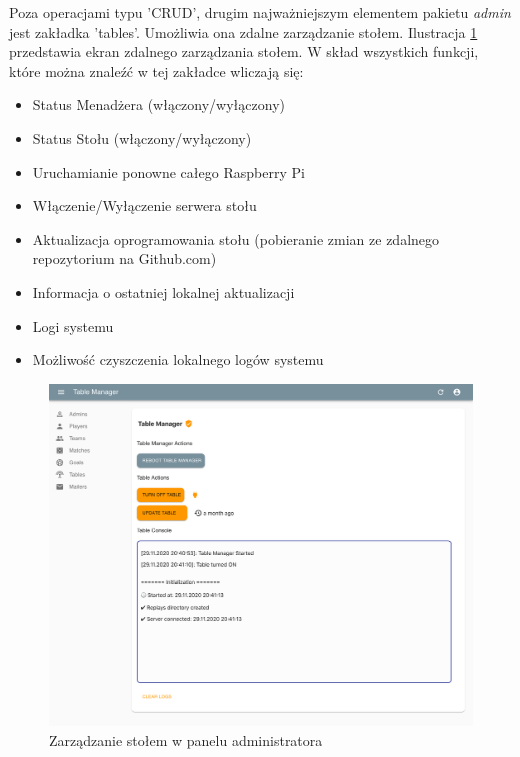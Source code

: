 Poza operacjami typu 'CRUD', drugim najważniejszym elementem pakietu \textit{admin} jest zakładka 'tables'. Umożliwia ona zdalne zarządzanie stołem. Ilustracja \ref{fig:admin-table-manager} przedstawia ekran zdalnego zarządzania stołem. W skład wszystkich funkcji, które można znaleźć w tej zakładce wliczają się:

\begin{itemize}
	\item Status Menadżera (włączony/wyłączony)
	\item Status Stołu (włączony/wyłączony)
	\item Uruchamianie ponowne całego Raspberry Pi
	\item Włączenie/Wyłączenie serwera stołu
	\item Aktualizacja oprogramowania stołu (pobieranie zmian ze zdalnego repozytorium na Github.com)
	\item Informacja o ostatniej lokalnej aktualizacji
	\item Logi systemu
	\item Możliwość czyszczenia lokalnego logów systemu
\end{itemize}

\begin{figure}[h!]
  \centering
    \includegraphics[width=\textwidth]{images/admin/table-manager.png}
  \caption{Zarządzanie stołem w panelu administratora}
  \label{fig:admin-table-manager}
\end{figure}

\newpage

